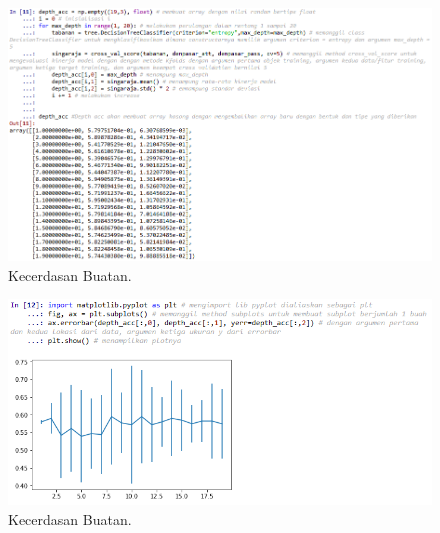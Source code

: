 
\hfill\break
\begin{figure}[H]
    \includegraphics[width=1\textwidth]{figures/1174006/chapter2/praktek/11.png}
    \centering
    \caption{Kecerdasan Buatan.}
\end{figure}


\hfill\break
\begin{figure}[H]
    \includegraphics[width=1\textwidth]{figures/1174006/chapter2/praktek/12.png}
    \centering
    \caption{Kecerdasan Buatan.}
\end{figure}

